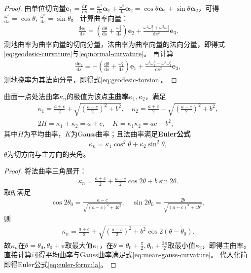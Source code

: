 \documentclass[../../main.tex]{subfiles}%
\begin{document}
\begin{proof}
由单位切向量$\boldsymbol{e}_1=\frac{\mathrm{d}\boldsymbol{r}}{\mathrm{d}s}=\frac{\omega^1}{\mathrm{d}s}\boldsymbol{\alpha}_1+\frac{\omega^2}{\mathrm{d}s}\boldsymbol{\alpha}_2=\cos\theta\boldsymbol{\alpha}_1+\sin\theta\boldsymbol{\alpha}_2$，可得$\frac{\omega^1}{\mathrm{d}s}=\cos\theta,\ \frac{\omega^2}{\mathrm{d}s}=\sin\theta$。
计算曲率向量：
\begin{align*}
\frac{\mathrm{d}\boldsymbol{e}_1}{\mathrm{d}s}=\left(\frac{\mathrm{d}\theta}{\mathrm{d}s}+\frac{\omega_1^2}{\mathrm{d}s}\right)\boldsymbol{e}_2+\frac{\omega^1\omega_1^3+\omega^2\omega_2^3}{\mathrm{d}s^2}\boldsymbol{e}_3.
\end{align*}
测地曲率为曲率向量的切向分量，法曲率为曲率向量的法向分量，即得式\eqref{eq:geodesic-curvature}与\eqref{eq:normal-curvature}。
再计算
\begin{align*}
\frac{\mathrm{d}\boldsymbol{e}_2}{\mathrm{d}s}=-\left(\frac{\mathrm{d}\theta}{\mathrm{d}s}+\frac{\omega_1^2}{\mathrm{d}s}\right)\boldsymbol{e}_1+\frac{\omega^1\omega_2^3-\omega^2\omega_1^3}{\mathrm{d}s^2}\boldsymbol{e}_3,
\end{align*}
测地挠率为其法向分量，即得式\eqref{eq:geodesic-torsion}。
\end{proof}

\begin{theorem}
曲面一点处法曲率$\kappa_n$的极值为该点\textbf{主曲率}$\kappa_1,\kappa_2$，满足
\begin{align}
\kappa_1=\frac{a+c}{2}+\sqrt{\left(\frac{a-c}{2}\right)^2+b^2},\quad \kappa_2=\frac{a+c}{2}-\sqrt{\left(\frac{a-c}{2}\right)^2+b^2},\label{eq:principal-curvature}\\
2H=\kappa_1+\kappa_2=a+c,\quad K=\kappa_1\kappa_2=ac-b^2,\label{eq:mean-gauss-curvature}
\end{align}
其中$H$为平均曲率，$K$为Gauss曲率；且法曲率满足\textbf{Euler公式}
\begin{align}
\kappa_n=\kappa_1\cos^2\theta+\kappa_2\sin^2\theta,\label{eq:euler-formula}
\end{align}
$\theta$为切方向与主方向的夹角。
\end{theorem}

\begin{proof}
将法曲率三角展开：
\begin{align*}
\kappa_n=\frac{a+c}{2}+\frac{a-c}{2}\cos2\theta+b\sin2\theta.
\end{align*}
取$\theta_0$满足
\begin{align*}
\cos2\theta_0=\frac{a-c}{\sqrt{(a-c)^2+4b^2}},\quad \sin2\theta_0=\frac{2b}{\sqrt{(a-c)^2+4b^2}},
\end{align*}
则
\begin{align*}
\kappa_n=\frac{a+c}{2}+\sqrt{\left(\frac{a-c}{2}\right)^2+b^2}\cos2(\theta-\theta_0).
\end{align*}
故$\kappa_n$在$\theta=\theta_0,\theta_0+\pi$取最大值$\kappa_1$，在$\theta=\theta_0+\frac{\pi}{2},\theta_0+\frac{3\pi}{2}$取最小值$\kappa_2$，即得主曲率。
直接计算可得平均曲率与Gauss曲率满足式\eqref{eq:mean-gauss-curvature}。
代入化简即得Euler公式\eqref{eq:euler-formula}。
\end{proof}
\end{document}
